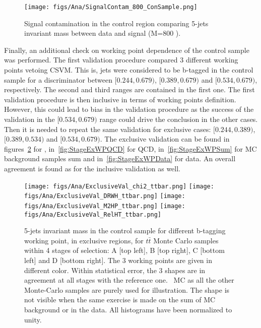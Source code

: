 \begin{figure}[!Hhtbp]
  \begin{center}
    \texttt{[image: figs/Ana/SignalContam\_800\_ConSample.png]}
    \caption{Signal contamination in the control region comparing 5-jets invariant mass between data and signal (M=800 \GeVcc).}
    \label{fig:SigContamination}
  \end{center}
\end{figure}

Finally, an additional check on working point dependence of the control sample was performed. The first validation procedure compared 3 different working points vetoing CSVM. This is, jets were considered to be b-tagged in the control sample for a discriminator between $[0.244,0.679)$, $[0.389,0.679)$ and $[0.534,0.679)$, respectively. The second and third ranges are contained in the first one. The first validation procedure is then inclusive in terms of working points definition. However, this could lead to bias in the validation procedure as the success of the validation in the $[0.534,0.679)$ range could drive the conclusion in the other cases. Then it is needed to repeat the same validation for exclusive cases: $[0.244,0.389)$, $[0.389,0.534)$ and $[0.534,0.679)$. The exclusive validation can be found in figures~\ref{fig:StageExWPttbar} for \ttbar, in~\ref{fig:StageExWPQCD} for QCD, in~\ref{fig:StageExWPSum} for MC background samples sum and in~\ref{fig:StageExWPData} for data. An overall agreement is found as for the inclusive validation as well.

\begin{figure}[!Hhtbp]
  \begin{center}
    \texttt{[image: figs/Ana/ExclusiveVal\_chi2\_ttbar.png]}
    \texttt{[image: figs/Ana/ExclusiveVal\_DRWH\_ttbar.png]}
    \texttt{[image: figs/Ana/ExclusiveVal\_M2HP\_ttbar.png]}
    \texttt{[image: figs/Ana/ExclusiveVal\_RelHT\_ttbar.png]}
    \caption{5-jets invariant mass in the control sample for different b-tagging working point, in exclusive regions, for $t\bar{t}$ Monte Carlo samples within 4 stages of selection: A [top left], B [top right], C [bottom left] and D [bottom right]. The 3 working points are given in different color. Within statistical error, the 3 shapes are in agreement at all stages with the reference one. \ttbar~MC as all the other Monte-Carlo samples are purely used for illustration. The shape is not visible when the same exercise is made on the sum of MC background or in the data. All histograms have been normalized to unity.}
    \label{fig:StageExWPttbar}
  \end{center}
\end{figure}

